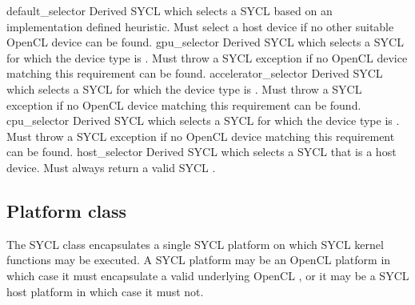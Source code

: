   \addRow
    {default_selector}
    {
      Derived SYCL  which selects a SYCL  based on an implementation defined heuristic. Must select a host device if no other suitable OpenCL device can be found.
    }
  \addRow
    {gpu_selector}
    {
      Derived SYCL  which selects a SYCL  for which the device type is . Must throw a  SYCL exception if no OpenCL device matching this requirement can be found.
    }
  \addRow
    {accelerator_selector}
    {
      Derived SYCL  which selects a SYCL  for which the device type is . Must throw a  SYCL exception if no OpenCL device matching this requirement can be found.
    }
  \addRow
    {cpu_selector}
    {
      Derived SYCL  which selects a SYCL  for which the device type is . Must throw a  SYCL exception if no OpenCL device matching this requirement can be found.    
    }
  \addRow
    {host_selector}
    {
      Derived SYCL  which selects a SYCL  that is a host device. Must always return a valid SYCL .
    }

\completeTable

\subsection{Platform class}

\label{sec:platform-class}

The SYCL  class encapsulates a single SYCL platform on which SYCL kernel functions may be executed. A SYCL platform may be an OpenCL platform in which case it must encapsulate a valid underlying OpenCL , or it may be a SYCL host platform in which case it must not.

